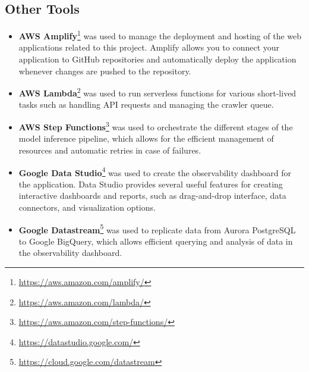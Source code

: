 \subsection{Other Tools}\label{subsec:other_tools}
\begin{itemize}
    \item \textbf{AWS Amplify}\footnote{\url{https://aws.amazon.com/amplify/}} was used to manage the deployment and hosting of the web applications related to this project.
    Amplify allows you to connect your application to GitHub repositories and automatically deploy the application whenever changes are pushed to the repository.
    \item \textbf{AWS Lambda}\footnote{\url{https://aws.amazon.com/lambda/}} was used to run serverless functions for various short-lived tasks such as handling API requests and managing the crawler queue.
    \item \textbf{AWS Step Functions}\footnote{\url{https://aws.amazon.com/step-functions/}} was used to orchestrate the different stages of the model inference pipeline, which allows for the efficient management of resources and automatic retries in case of failures.
    \item \textbf{Google Data Studio}\footnote{\url{https://datastudio.google.com/}} was used to create the observability dashboard for the application.
    Data Studio provides several useful features for creating interactive dashboards and reports, such as drag-and-drop interface, data connectors, and visualization options.
    \item \textbf{Google Datastream}\footnote{\url{https://cloud.google.com/datastream}} was used to replicate data from Aurora PostgreSQL to Google BigQuery, which allows efficient querying and analysis of data in the observability dashboard.
\end{itemize}